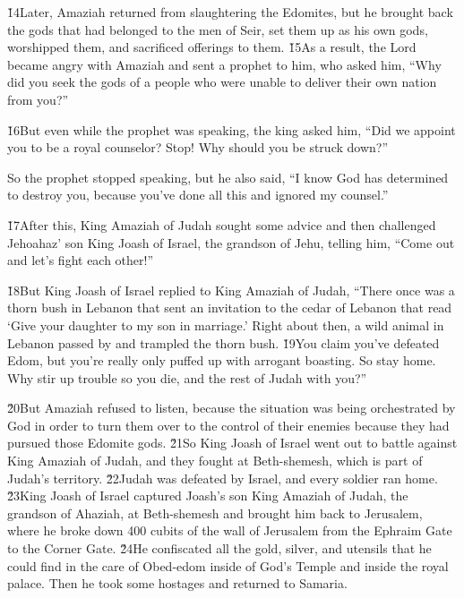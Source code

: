 \v{14}Later, Amaziah returned from slaughtering the Edomites, but he brought back the gods that had belonged to the men of Seir, set them up as his own gods, worshipped them, and sacrificed offerings to them. \v{15}As a result, the Lord became angry with Amaziah and sent a prophet to him, who asked him, ``Why did you seek the gods of a people who were unable to deliver their own nation from you?''

\v{16}But even while the prophet was speaking, the king asked him, ``Did we appoint you to be a royal counselor? Stop! Why should you be struck down?''

So the prophet stopped speaking, but he also said, ``I know God has determined to destroy you, because you've done all this and ignored my counsel.''

\v{17}After this, King Amaziah of Judah sought some advice and then challenged Jehoahaz' son King Joash of Israel, the grandson of Jehu, telling him, ``Come out and let's fight each other!''

\v{18}But King Joash of Israel replied to King Amaziah of Judah, ``There once was a thorn bush in Lebanon that sent an invitation to the cedar of Lebanon that read `Give your daughter to my son in marriage.' Right about then, a wild animal in Lebanon passed by and trampled the thorn bush. \v{19}You claim you've defeated Edom, but you're really only puffed up with arrogant boasting. So stay home. Why stir up trouble so you die, and the rest of Judah with you?''

\v{20}But Amaziah refused to listen, because the situation was being orchestrated by God in order to turn them over to the control of their enemies because they had pursued those Edomite gods. \v{21}So King Joash of Israel went out to battle against King Amaziah of Judah, and they fought at Beth-shemesh, which is part of Judah's territory. \v{22}Judah was defeated by Israel, and every soldier ran home. \v{23}King Joash of Israel captured Joash's son King Amaziah of Judah, the grandson of Ahaziah, at Beth-shemesh and brought him back to Jerusalem, where he broke down 400 cubits of the wall of Jerusalem from the Ephraim Gate to the Corner Gate. \v{24}He confiscated all the gold, silver, and utensils that he could find in the care of Obed-edom inside of God's Temple and inside the royal palace. Then he took some hostages and returned to Samaria.

